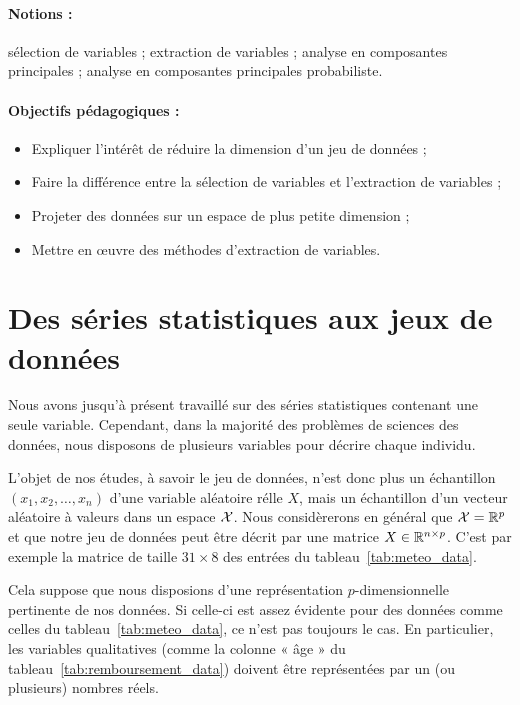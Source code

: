 \label{chap:dimred}

\paragraph{Notions :} sélection de variables ; extraction de variables ;
 analyse en composantes principales ; analyse en composantes principales probabiliste.
\paragraph{Objectifs pédagogiques :} 
\begin{itemize}      
  \setlength{\itemsep}{3pt}
\item Expliquer l'intérêt de réduire la dimension d'un jeu de données ;
\item Faire la différence entre la sélection de variables et l'extraction de variables ;
\item Projeter des données sur un espace de plus petite dimension ;%
\item Mettre en \oe{}uvre des méthodes d'extraction de variables.
\end{itemize}

\section{Des séries statistiques aux jeux de données}
Nous avons jusqu'à présent travaillé sur des séries statistiques contenant une
seule variable. Cependant, dans la majorité des problèmes de sciences des
données, nous disposons de plusieurs variables pour décrire chaque individu.

L'objet de nos études, à savoir le jeu de données, n'est donc plus un
échantillon $(x_1, x_2, \dots, x_n)$ d'une variable aléatoire rélle $X$, mais
un échantillon d'un vecteur aléatoire à valeurs dans un espace $\mathcal{X}$. Nous
considèrerons en général que $\mathcal{X} = \mathbb{R}^p$ et que notre jeu de données peut
être décrit par une matrice $X \in \mathbb{R}^{n \times p}$.  C'est par exemple la
matrice de taille $31 \times 8$ des entrées du tableau~\ref{tab:meteo_data}.

Cela suppose que nous disposions d'une représentation $p$-dimensionnelle
pertinente de nos données. Si celle-ci est assez évidente pour des données
comme celles du tableau~\ref{tab:meteo_data}, ce n'est pas toujours le cas. En
particulier, les variables qualitatives (comme la colonne « âge » du
tableau~\ref{tab:remboursement_data}) doivent être représentées par un (ou
plusieurs) nombres réels. 

